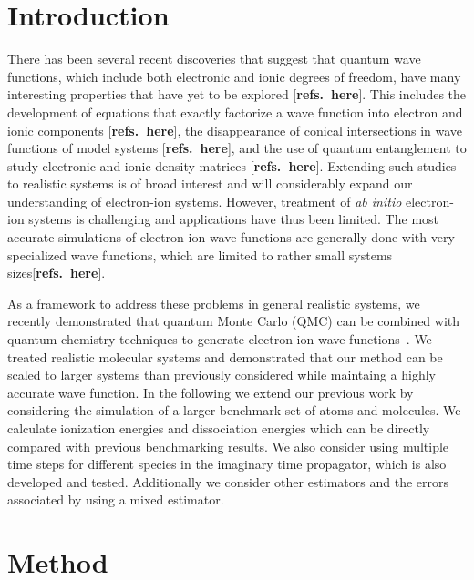 \documentclass[pra,superscriptaddress,groupedaddress,twocolumn]{revtex4}
\begin{document}
\section{Introduction}
There has been several recent discoveries that suggest that quantum wave functions, which include both electronic and ionic degrees of freedom, have many interesting properties that have yet to be explored [{\bf refs.~here}].  This includes the development of equations that exactly factorize a wave function into electron and ionic components [{\bf refs.~here}], the disappearance of conical intersections in wave functions of model systems [{\bf refs.~here}], and the use of quantum entanglement to study electronic and ionic density matrices [{\bf refs.~here}].  Extending such studies to realistic systems is of broad interest and will considerably expand our understanding of electron-ion systems.   However, treatment of \textit{ab initio} electron-ion systems is challenging and applications have thus been limited.   The most accurate simulations of electron-ion wave functions are generally done with very specialized wave functions, which are limited to rather small systems sizes[{\bf refs.~here}].  

As a framework to address these problems in general realistic systems, we recently demonstrated that quantum Monte Carlo (QMC) can be combined with quantum chemistry techniques to generate electron-ion wave functions~\cite{Tubman_ECG}.  We treated realistic molecular systems and demonstrated that our method can be scaled to larger systems than previously considered while maintaing a highly accurate wave function.  In the following we extend our previous work by considering the simulation of a larger benchmark set of atoms and molecules.  We calculate ionization energies and dissociation energies which can be directly compared with previous benchmarking results.  We also consider using multiple time steps for different species in the imaginary time propagator, which is also developed and tested.  Additionally we consider other estimators and the errors associated by using a mixed estimator.

\section{Method}
\end{document}
